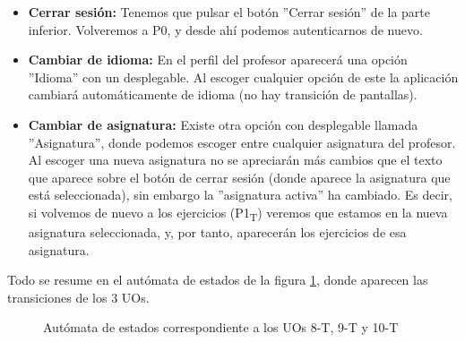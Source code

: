 \begin{itemize}
\item \textbf{Cerrar sesión:} Tenemos que pulsar el botón ''Cerrar sesión'' de la parte inferior. Volveremos a P0, y desde ahí podemos autenticarnos de nuevo.
\item \textbf{Cambiar de idioma:} En el perfil del profesor aparecerá una opción ''Idioma'' con un desplegable. Al escoger cualquier opción de este la aplicación cambiará automáticamente de idioma (no hay transición de pantallas).
\item \textbf{Cambiar de asignatura:} Existe otra opción con desplegable llamada ''Asignatura'', donde podemos escoger entre cualquier asignatura del profesor. Al escoger una nueva asignatura no se apreciarán más cambios que el texto que aparece sobre el botón de cerrar sesión (donde aparece la asignatura que está seleccionada), sin embargo la ''asignatura activa'' ha cambiado. Es decir, si volvemos de nuevo a los ejercicios (P1\textsubscript{T}) veremos que estamos en la nueva asignatura seleccionada, y, por tanto, aparecerán los ejercicios de esa asignatura.\\
\end{itemize}

Todo se resume en el autómata de estados de la figura \ref{fig:analisis-de-requisitos:funcionales:uo8-9-10t:fsm}, donde aparecen las transiciones de los 3 UOs.\\

\noindent
\begin{figure}[!htbp]
\noindent
{}
\caption{Autómata de estados correspondiente a los UOs 8-T, 9-T y 10-T}
\label{fig:analisis-de-requisitos:funcionales:uo8-9-10t:fsm}
\end{figure}




